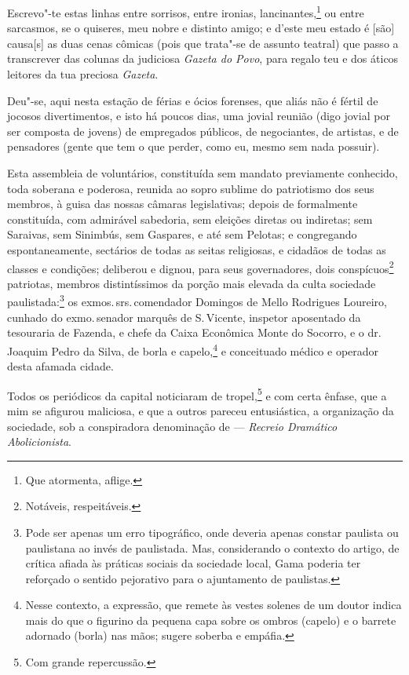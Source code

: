 Escrevo"-te estas linhas entre sorrisos, entre ironias,
lancinantes,\footnote{Que atormenta, aflige.} ou entre sarcasmos, se o
quiseres, meu nobre e distinto amigo; e d'este meu estado é {[}são{]}
causa{[}s{]} as duas cenas cômicas (pois que trata"-se de assunto
teatral) que passo a transcrever das colunas da judiciosa \emph{Gazeta
do Povo}, para regalo teu e dos áticos leitores da tua preciosa
\emph{Gazeta}.

Deu"-se, aqui nesta estação de férias e ócios forenses, que aliás não é
fértil de jocosos divertimentos, e isto há poucos dias, uma jovial
reunião (digo jovial por ser composta de jovens) de empregados públicos,
de negociantes, de artistas, e de pensadores (gente que tem o que
perder, como eu, mesmo sem nada possuir).

Esta assembleia de voluntários, constituída sem mandato previamente
conhecido, toda soberana e poderosa, reunida ao sopro sublime do
patriotismo dos seus membros, à guisa das nossas câmaras legislativas;
depois de formalmente constituída, com admirável sabedoria, sem eleições
diretas ou indiretas; sem Saraivas, sem Sinimbús, sem Gaspares, e até
sem Pelotas; e congregando espontaneamente, sectários de todas as seitas
religiosas, e cidadãos de todas as classes e condições; deliberou e
dignou, para seus governadores, dois conspícuos\footnote{Notáveis,
  respeitáveis.} patriotas, membros distintíssimos da porção mais
elevada da culta sociedade paulistada:\footnote{Pode ser apenas um erro
  tipográfico, onde deveria apenas constar paulista ou paulistana ao
  invés de paulistada. Mas, considerando o contexto do artigo, de
  crítica afiada às práticas sociais da sociedade local, Gama poderia
  ter reforçado o sentido pejorativo para o ajuntamento de paulistas.}
os exmos.\,srs.\,comendador Domingos de Mello Rodrigues Loureiro, cunhado
do exmo.\,senador marquês de S.\,Vicente, inspetor aposentado da
tesouraria de Fazenda, e chefe da Caixa Econômica Monte do Socorro, e o
dr.\,Joaquim Pedro da Silva, de borla e capelo,\footnote{Nesse contexto, a expressão, que
  remete às vestes solenes de um doutor indica mais do
  que o figurino da pequena capa sobre os ombros (capelo) e o barrete
  adornado (borla) nas mãos; sugere soberba e empáfia.} e conceituado
médico e operador desta afamada cidade.

Todos os periódicos da capital noticiaram de tropel,\footnote{Com
  grande repercussão.} e com certa ênfase, que a mim se afigurou
maliciosa, e que a outros pareceu entusiástica, a organização da
sociedade, sob a conspiradora denominação de --- \emph{Recreio
Dramático Abolicionista}.

